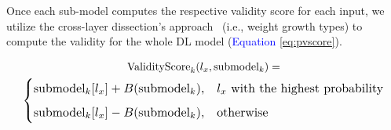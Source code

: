  

Once each sub-model computes the respective validity score for each input, we utilize the cross-layer dissection's approach~\cite{wang2020dissector}  (i.e., weight growth types) to compute the validity for the whole DL model (\textcolor{blue}{Equation} \ref{eq:pvscore}).



{\small
\begin{gather}
\label{eq:ic}
\text{ValidityScore}_k(l_x, \text{submodel}_k) = \\
\resizebox{0.98\columnwidth}{!}{
$
    \begin{cases}
       \text{submodel}_k[l_x] + B(\text{submodel}_k), & %
        l_x  \text{ with the highest probability} \\[5pt]%
        \text{submodel}_k[l_x] -B(\text{submodel}_k), & \text{otherwise}
    \end{cases}
$
} \nonumber
\end{gather}
}

